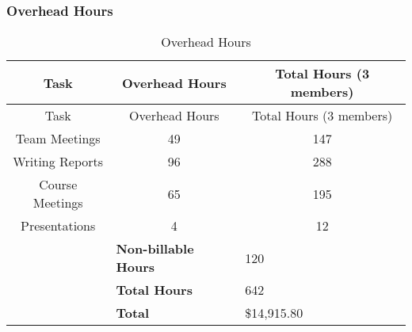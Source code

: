 \subsubsection{Overhead Hours}

\setlength{\extrarowheight}{1.5pt}
  \begin{longtable}{|c|c|c|}
 \caption{Overhead Hours\label{overheadHours}} \\
   \hline
  
  \centering Task & Overhead Hours & Total Hours (3 members) \\
  \hline \hline \endfirsthead
  
     \hline

	\centering Task & Overhead Hours & Total Hours (3 members) \\
	\hline \hline \endhead

 \endfoot  

	Team Meetings & 49 & 147 \\ \hline
	Writing Reports & 96 & 288 \\ \hline
	Course Meetings & 65 & 195 \\ \hline	  
	Presentations & 4 & 12 \\ \hline
  \multicolumn{1}{l}{}      & \multicolumn{1}{l}{\textbf{Non-billable Hours}} & \multicolumn{1}{l}{120}  \\
  \multicolumn{1}{l}{}      & \multicolumn{1}{l}{\textbf{Total Hours}} & \multicolumn{1}{l}{642}  \\
  \multicolumn{1}{l}{}      & \multicolumn{1}{l}{\textbf{Total}} & \multicolumn{1}{l}{\$14,915.80}
    \end{longtable}